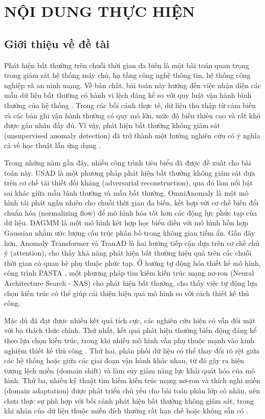 \documentclass[a4paper]{article}
\begin{document}
\thispagestyle{empty}
\pagebreak

\section{NỘI DUNG THỰC HIỆN}

\subsection{Giới thiệu về đề tài}

Phát hiện bất thường trên chuỗi thời gian đa biến là một bài toán quan trọng trong giám sát hệ thống máy chủ, hạ tầng công nghệ thông tin, hệ thống công nghiệp và an ninh mạng. Về bản chất, bài toán này hướng đến việc nhận diện các mẫu dữ liệu bất thường có hành vi lệch đáng kể so với quy luật vận hành bình thường của hệ thống \cite{anomaly_survey}. Trong các bối cảnh thực tế, dữ liệu thu thập từ cảm biến và các bản ghi vận hành thường có quy mô lớn, mức độ biến thiên cao và rất khó được gán nhãn đầy đủ. Vì vậy, phát hiện bất thường không giám sát (unsupervised anomaly detection) đã trở thành một hướng nghiên cứu có ý nghĩa cả về học thuật lẫn ứng dụng \cite{anomaly_survey}.

Trong những năm gần đây, nhiều công trình tiêu biểu đã được đề xuất cho bài toán này. USAD \cite{usad} là một phương pháp phát hiện bất thường không giám sát dựa trên cơ chế tái thiết đối kháng (adversarial reconstruction), qua đó làm nổi bật sai khác giữa mẫu bình thường và mẫu bất thường. OmniAnomaly \cite{omnianomaly} là một mô hình tái phát ngẫu nhiên cho chuỗi thời gian đa biến, kết hợp với cơ chế biến đổi chuẩn hóa (normalizing flow) để mô hình hóa tốt hơn các động lực phức tạp của dữ liệu. DAGMM \cite{dagmm} là một mô hình kết hợp học biểu diễn với mô hình hỗn hợp Gaussian nhằm ước lượng cấu trúc phân bố trong không gian tiềm ẩn. Gần đây hơn, Anomaly Transformer \cite{anomaly_transformer} và TranAD \cite{tranad} là hai hướng tiếp cận dựa trên cơ chế chú ý (attention), cho thấy khả năng phát hiện bất thường hiệu quả trên các chuỗi thời gian có quan hệ phụ thuộc phức tạp. Ở hướng tự động hóa thiết kế mô hình, công trình PASTA \cite{pasta}, một phương pháp tìm kiếm kiến trúc mạng nơ-ron (Neural Architecture Search - NAS) cho phát hiện bất thường, cho thấy việc tự động lựa chọn kiến trúc có thể giúp cải thiện hiệu quả mô hình so với cách thiết kế thủ công.

Mặc dù đã đạt được nhiều kết quả tích cực, các nghiên cứu hiện có vẫn đối mặt với ba thách thức chính. Thứ nhất, kết quả phát hiện thường biến động đáng kể theo lựa chọn kiến trúc, trong khi nhiều mô hình vẫn phụ thuộc mạnh vào kinh nghiệm thiết kế thủ công \cite{usad, omnianomaly, pasta}. Thứ hai, phân phối dữ liệu có thể thay đổi rõ rệt giữa các hệ thống hoặc giữa các giai đoạn vận hành khác nhau, từ đó gây ra hiện tượng lệch miền (domain shift) và làm suy giảm năng lực khái quát hóa của mô hình. Thứ ba, nhiều kỹ thuật tìm kiếm kiến trúc mạng nơ-ron và thích nghi miền (domain adaptation) được phát triển chủ yếu cho bài toán phân lớp có nhãn, nên chưa thực sự phù hợp với bối cảnh phát hiện bất thường không giám sát, trong khi nhãn của dữ liệu thuộc miền đích thường rất hạn chế hoặc không sẵn có \cite{adaptnas, pasta}.
\end{document}
